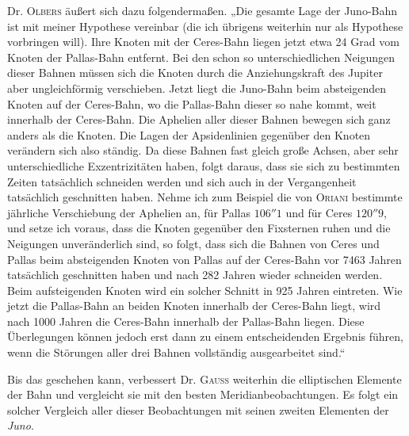Dr. \textsc{Olbers} äußert sich dazu folgendermaßen. „Die gesamte Lage der Juno-Bahn ist mit meiner Hypothese vereinbar (die ich übrigens weiterhin nur als Hypothese vorbringen will). Ihre Knoten mit der Ceres-Bahn liegen jetzt etwa 24 Grad vom Knoten der Pallas-Bahn entfernt. Bei den schon so unterschiedlichen Neigungen dieser Bahnen müssen sich die Knoten durch die Anziehungskraft des Jupiter aber ungleichförmig verschieben. Jetzt liegt die Juno-Bahn beim absteigenden Knoten auf der Ceres-Bahn, wo die Pallas-Bahn dieser so nahe kommt, weit innerhalb der Ceres-Bahn. Die Aphelien aller dieser Bahnen bewegen sich ganz anders als die Knoten. Die Lagen der Apsidenlinien gegenüber den Knoten verändern sich also ständig. Da diese Bahnen fast gleich große Achsen, aber sehr unterschiedliche Exzentrizitäten haben, folgt daraus, dass sie sich zu bestimmten Zeiten tatsächlich schneiden werden und sich auch in der Vergangenheit tatsächlich geschnitten haben. Nehme ich zum Beispiel die von \textsc{Oriani} bestimmte jährliche Verschiebung der Aphelien an, für Pallas $106''1$ und für Ceres $120''9$, und setze ich voraus, dass die Knoten gegenüber den Fixsternen ruhen und die Neigungen unveränderlich sind, so folgt, dass sich die Bahnen von Ceres und Pallas beim absteigenden Knoten von Pallas auf der Ceres-Bahn vor 7463 Jahren tatsächlich geschnitten haben und nach 282 Jahren wieder schneiden werden. Beim aufsteigenden Knoten wird ein solcher Schnitt in 925 Jahren eintreten. Wie jetzt die Pallas-Bahn an beiden Knoten innerhalb der Ceres-Bahn liegt, wird nach 1000 Jahren die Ceres-Bahn innerhalb der Pallas-Bahn liegen. Diese Überlegungen können jedoch erst dann zu einem entscheidenden Ergebnis führen, wenn die Störungen aller drei Bahnen vollständig ausgearbeitet sind.“

Bis das geschehen kann, verbessert Dr. \textsc{Gauss} weiterhin die elliptischen Elemente der Bahn und vergleicht sie mit den besten Meridianbeobachtungen. Es folgt ein solcher Vergleich aller dieser Beobachtungen mit seinen zweiten Elementen der \emph{Juno}.

